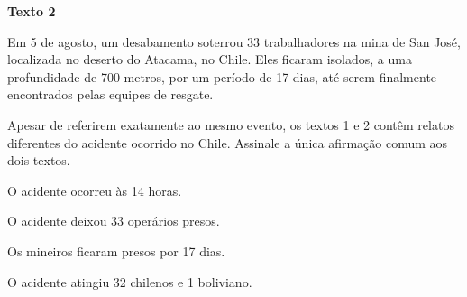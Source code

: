 
\begin{myquote}

\textbf{Texto 2}

Em 5 de agosto, um desabamento soterrou 33 trabalhadores na mina de San José,
localizada no deserto do Atacama, no Chile. Eles ficaram isolados, a uma
profundidade de 700 metros, por um período de 17 dias, até serem finalmente
encontrados pelas equipes de resgate.


\end{myquote}


\renewcommand{\fonte}[1]{}

Apesar de referirem exatamente ao mesmo evento, os textos 1 e 2 contêm  
relatos diferentes do acidente ocorrido no Chile. Assinale a única afirmação
comum aos dois textos. 

\begin{escolha}

    \item O acidente ocorreu às 14 horas.

    \item O acidente deixou 33 operários presos.

    \item Os mineiros ficaram presos por 17 dias.

    \item O acidente atingiu 32 chilenos e 1 boliviano.

\end{escolha}

